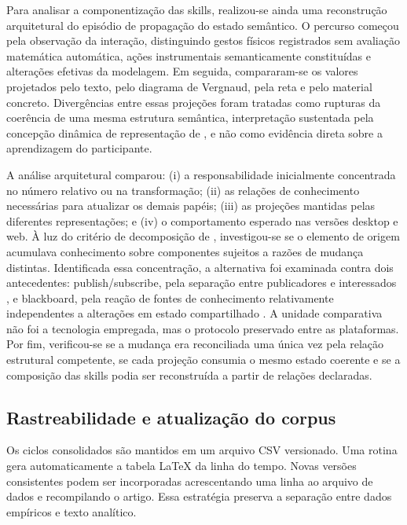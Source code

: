 \documentclass[preprint,12pt,authoryear]{elsarticle}
\begin{document}
Para analisar a componentização das skills, realizou-se ainda uma reconstrução arquitetural do episódio de propagação do estado semântico. O percurso começou pela observação da interação, distinguindo gestos físicos registrados sem avaliação matemática automática, ações instrumentais semanticamente constituídas e alterações efetivas da modelagem. Em seguida, compararam-se os valores projetados pelo texto, pelo diagrama de Vergnaud, pela reta e pelo material concreto. Divergências entre essas projeções foram tratadas como rupturas da coerência de uma mesma estrutura semântica, interpretação sustentada pela concepção dinâmica de representação de \citet{vergnaud1998representation}, e não como evidência direta sobre a aprendizagem do participante.

A análise arquitetural comparou: (i) a responsabilidade inicialmente concentrada no número relativo ou na transformação; (ii) as relações de conhecimento necessárias para atualizar os demais papéis; (iii) as projeções mantidas pelas diferentes representações; e (iv) o comportamento esperado nas versões desktop e web. À luz do critério de decomposição de \citet{parnas1972criteria}, investigou-se se o elemento de origem acumulava conhecimento sobre componentes sujeitos a razões de mudança distintas. Identificada essa concentração, a alternativa foi examinada contra dois antecedentes: publish/subscribe, pela separação entre publicadores e interessados \citep{eugster2003many}, e blackboard, pela reação de fontes de conhecimento relativamente independentes a alterações em estado compartilhado \citep{nii1986blackboard}. A unidade comparativa não foi a tecnologia empregada, mas o protocolo preservado entre as plataformas. Por fim, verificou-se se a mudança era reconciliada uma única vez pela relação estrutural competente, se cada projeção consumia o mesmo estado coerente e se a composição das skills podia ser reconstruída a partir de relações declaradas.

\subsection{Rastreabilidade e atualização do corpus}
Os ciclos consolidados são mantidos em um arquivo CSV versionado. Uma rotina gera automaticamente a tabela LaTeX da linha do tempo. Novas versões consistentes podem ser incorporadas acrescentando uma linha ao arquivo de dados e recompilando o artigo. Essa estratégia preserva a separação entre dados empíricos e texto analítico.
\end{document}
